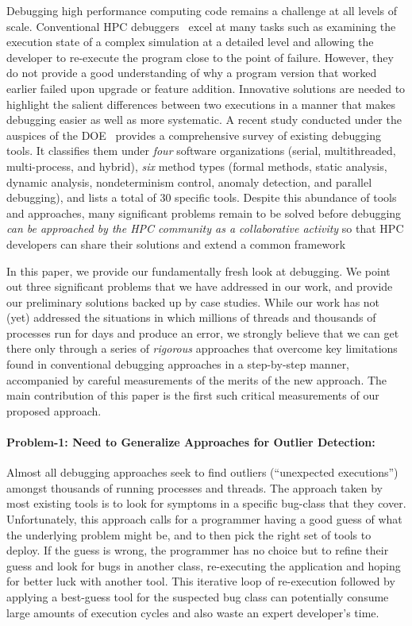 

Debugging high performance computing code
remains a challenge at all levels of scale.
%
Conventional HPC debuggers~\cite{allinea-ddt,roguewave,others}
excel at many tasks such as examining the execution
state of a complex simulation at a detailed
level and allowing the developer to re-execute
the program close to the point of failure.
%
However, they do not provide a good understanding
of why a program version that worked earlier
failed upon upgrade or feature addition.
%
Innovative solutions are needed to highlight the
salient differences between two executions in a manner
that makes debugging easier as well as more systematic.
%
A recent study conducted under the auspices of the
DOE~\cite{DBLP:journals/corr/GopalakrishnanH17}
provides a comprehensive survey
of existing debugging tools.
%
It classifies them under
{\em four} software organizations (serial, multithreaded,
multi-process, and hybrid), {\em six}
method types (formal methods, static analysis, dynamic
analysis, nondeterminism control, anomaly detection,
and parallel debugging), and lists a total of 30 specific
tools.
%
Despite this abundance of tools and approaches, many
significant problems remain to be solved before debugging
{\em can be approached by the HPC community as a collaborative
activity} so that HPC developers can share their solutions
and extend a common framework


In this paper, we provide our fundamentally fresh look
at debugging.
%
We point out three significant problems that
we have addressed in our work, and provide our preliminary
solutions backed up by case studies.
%
While our work has not (yet) addressed the situations in
which millions of threads and thousands of processes run
for days and produce an error,
we strongly believe that we can get there only through
a series of {\em rigorous} approaches
that overcome key limitations found in conventional
debugging approaches in a step-by-step manner, accompanied
by careful measurements of the merits of the new approach.
%
The main contribution of this paper is the first such
critical measurements of our proposed approach.


\paragraph{Problem-1: Need to Generalize Approaches for Outlier Detection:\/}
%
Almost all debugging approaches seek to find outliers (``unexpected
executions'') amongst thousands of running processes and threads.
%
The approach taken by most existing tools is to
look for symptoms in a specific bug-class that they
cover.
%
Unfortunately,
this approach calls for a programmer having a good guess of what
the underlying problem might be,
and to then pick the right set of tools to deploy.
%
If the guess is wrong, the programmer has no choice but to
refine their guess
and look for bugs in another class,
re-executing the application and hoping for
better luck with another tool.
%
This iterative loop of re-execution followed by applying a
best-guess tool for the suspected bug class can potentially consume
large amounts of execution cycles and also waste an
expert developer's time.


